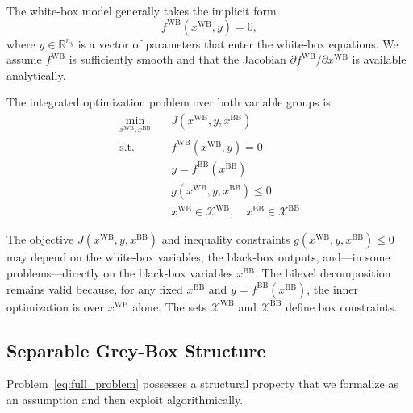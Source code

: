 \documentclass[12pt,a4paper]{article}%
\theoremstyle{plain}%
\theoremstyle{remark}%
\theoremstyle{definition}%
\def\WB{\mathrm{WB}}
\def\BB{\mathrm{BB}}
\begin{document}
The white-box model generally takes the implicit form
\begin{equation}\label{eq:process_model}
    f^{\WB}(x^{\WB}, y) = 0,
\end{equation}
where $y \in \mathbb{R}^{n_y}$ is a vector of parameters that enter the white-box equations. We assume $f^{\WB}$ is sufficiently smooth and that the Jacobian $\partial f^{\WB}/\partial x^{\WB}$ is available analytically.

The integrated optimization problem over both variable groups is
\begin{subequations}\label{eq:full_problem}
\begin{align}
    \min_{x^{\WB}, x^{\BB}} \quad & J(x^{\WB}, y, x^{\BB}) \label{eq:objective}\\
    \text{s.t.} \quad & f^{\WB}(x^{\WB}, y) = 0 \label{eq:process_constraint}\\
    & y = f^{\BB}(x^{\BB}) \label{eq:material_constraint}\\
    & g(x^{\WB}, y, x^{\BB}) \leq 0 \label{eq:inequality_constraints}\\
    & x^{\WB} \in \mathcal{X}^{\WB}, \quad x^{\BB} \in \mathcal{X}^{\BB} \label{eq:bounds}
\end{align}
\end{subequations}

The objective $J(x^{\WB}, y, x^{\BB})$ and inequality constraints $g(x^{\WB}, y, x^{\BB}) \leq 0$ may depend on the white-box variables, the black-box outputs, and---in some problems---directly on the black-box variables $x^{\BB}$. The bilevel decomposition remains valid because, for any fixed $x^{\BB}$ and $y = f^{\BB}(x^{\BB})$, the inner optimization is over $x^{\WB}$ alone. The sets $\mathcal{X}^{\WB}$ and $\mathcal{X}^{\BB}$ define box constraints.

\subsection{Separable Grey-Box Structure}\label{subsec:separability}

Problem~\eqref{eq:full_problem} possesses a structural property that we formalize as an assumption and then exploit algorithmically.
\end{document}
